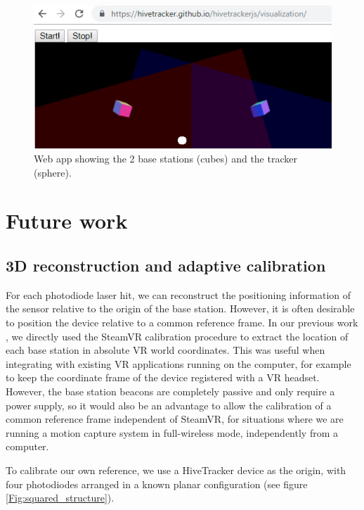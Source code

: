 \documentclass[sigchi]{acmart}
\begin{document}
\begin{figure}[h]
  \centering
  \includegraphics[width=\linewidth]{Figures/webapp.png}
  \caption{Web app showing the 2 base stations (cubes) and the tracker (sphere).}
  \label{Fig:webapp}
\end{figure}


\section{Future work}

\subsection{3D reconstruction and adaptive calibration}

For each photodiode laser hit, we can reconstruct the positioning information of the sensor relative to the origin of the base station. However, it is often desirable to position the device relative to a common reference frame. In our previous work \cite{Quinones2018}, we directly used the SteamVR calibration procedure to extract the location of each base station in absolute VR world coordinates. This was useful when integrating with existing VR applications running on the computer, for example to keep the coordinate frame of the device registered with a VR headset. However, the base station beacons are completely passive and only require a power supply, so it would also be an advantage to allow the calibration of a common reference frame independent of SteamVR, for situations where we are running a motion capture system in full-wireless mode, independently from a computer.

To calibrate our own reference, we use a HiveTracker device as the origin, with four photodiodes arranged in a known planar configuration (see figure \ref{Fig:squared_structure}).
\end{document}
